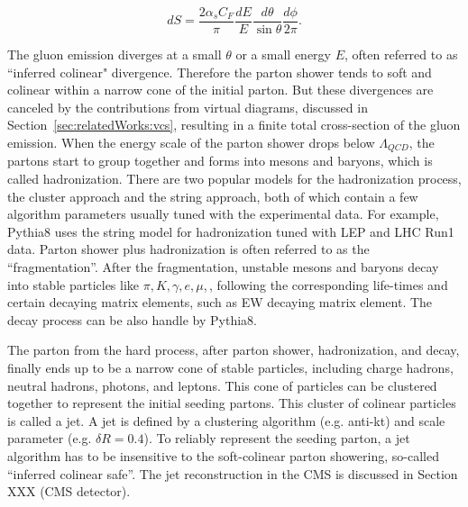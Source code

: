 \begin{equation}
    dS = \frac{2\alpha_s C_F}{\pi} \frac{dE}{E}\frac{d\theta}{\sin \theta} \frac{d\phi}{2\pi}.
\end{equation}

\noindent The gluon emission diverges at a small $\theta$ or a small energy $E$, often referred to as ``inferred colinear" divergence. Therefore the parton shower tends to soft and colinear within a narrow cone of the initial parton. But these divergences are canceled by the contributions from virtual diagrams, discussed in Section~\ref{sec:relatedWorks:vcs}, resulting in a finite total cross-section of the gluon emission. When the energy scale of the parton shower drops below $\Lambda_{QCD}$, the partons start to group together and forms into mesons and baryons, which is called hadronization. There are two popular models for the hadronization process, the cluster approach and the string approach, both of which contain a few algorithm parameters usually tuned with the experimental data. For example, Pythia8 uses the string model for hadronization tuned with LEP and LHC Run1 data. Parton shower plus hadronization is often referred to as the ``fragmentation''. After the fragmentation, unstable mesons and baryons decay into stable particles like $\pi, K, \gamma, e, \mu, $, following the corresponding life-times and certain decaying matrix elements, such as EW decaying matrix element. The decay process can be also handle by Pythia8.

The parton from the hard process, after parton shower, hadronization, and decay, finally ends up to be a narrow cone of stable particles, including charge hadrons, neutral hadrons, photons, and leptons. This cone of particles can be clustered together to represent the initial seeding partons. This cluster of colinear particles is called a jet. A jet is defined by a clustering algorithm (e.g. anti-kt) and scale parameter (e.g. $\delta R=0.4$). To reliably represent the seeding parton, a jet algorithm has to be  insensitive to the soft-colinear parton showering, so-called ``inferred colinear safe''. The jet reconstruction in the CMS is discussed in Section XXX (CMS detector).

